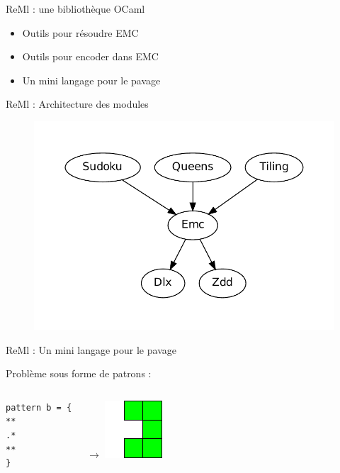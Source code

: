 \documentclass{beamer}
\begin{document}
\begin{frame}{ReMl : une bibliothèque OCaml}
\begin{itemize}
\item Outils pour résoudre EMC
\item Outils pour encoder dans EMC
\item Un mini langage pour le pavage
\end{itemize}
\end{frame}


\begin{frame}{ReMl : Architecture des modules}
\begin{figure}[htp]
\begin{center}
\includegraphics[scale=0.5]{../imports/archi_slide.pdf}
\end{center}
\end{figure}
\end{frame}

\begin{frame}[fragile]{ReMl : Un mini langage pour le pavage}

Problème sous forme de patrons : 
\begin{columns}
\begin{lstlisting}
pattern b = {
**
.*
**
}
\end{lstlisting}
		$\rightarrow$
\includegraphics[scale=1]{../imports/patron.pdf}
\end{columns}
\end{frame}
\end{document}
